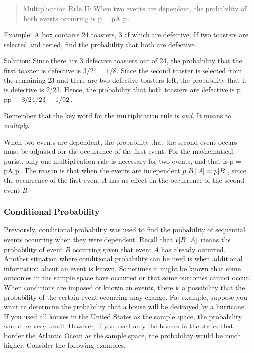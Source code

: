 \begin{quote}
Multiplication Rule II: When two events are dependent, the probability of both events occurring is 
\beq
p = p\vat A p\,.
\eeq
\end{quote}

Example: A box contains 24 toasters, 3 of which are defective. If two toasters are selected and tested, find the probability that both are defective.

Solution: Since there are 3 defective toasters out of 24, the probability that the first toaster is defective is $3/24 = 1/8$. Since the second toaster is selected from the remaining 23 and there are two defective toasters left, the probability that it is defective is $2/23$. Hence, the probability that both toasters are defective is
\beq
p = pp = 3/24/23 = 1/92\,.
\eeq

Remember that the key word for the multiplication rule is \emph{and}. It means to \emph{multiply}.

When two events are dependent, the probability that the second event occurs must be adjusted for the occurrence of the first event. For the mathematical purist, only one multiplication rule is necessary for two events, and that is
\beq
p = p\vat A p\,.
\eeq
The reason is that when the events are independent $p\!\left[{B\operatorname{\vert} A}\right] = p\!\left[{B}\right]$, since the occurrence of the first event $A$ has no effect on the occurrence of the second event $B$.


\subsubsection{Conditional Probability}
Previously, conditional probability was used to find the probability of sequential events occurring when they were dependent. Recall that $p\!\left[{B\operatorname{\vert} A}\right]$ means the probability of event $B$ occurring given that event $A$ has already occurred. Another situation where conditional probability can be used is when additional information about an event is known. Sometimes it might be known that some outcomes in the sample space have occurred or that some outcomes cannot occur. When conditions are imposed or known on events, there is a possibility that the probability of the certain event occurring may change. For example, suppose you want to determine the probability that a house will be destroyed by a hurricane. If you used all houses in the United States as the sample space, the probability would be very small. However, if you used only the houses in the states that border the Atlantic Ocean as the sample space, the probability would be much higher. Consider the following examples.

